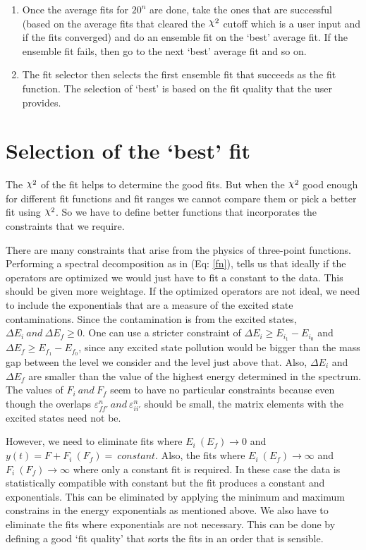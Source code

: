 \documentclass[10pt]{article}
\DeclareRobustCommand{\rchi}{{\mathpalette\irchi\relax}}
\newcommand{\irchi}[2]{\raisebox{\depth}{$#1\chi$}} %
\begin{document}
\begin{enumerate}
  \item Once the average fits for $20^n$ are done, take the ones that are successful (based on the average fits that cleared the $\rchi^2$ cutoff which is a user input and if the fits converged) and do an ensemble fit on the `best' average fit. If the ensemble fit fails, then go to the next `best' average fit and so on.
  \item The fit selector then selects the first ensemble fit that succeeds as the fit function. The selection of `best' is based on the fit quality that the user provides.
\end{enumerate}

\section{Selection of the `best' fit}
The $\rchi^2$ of the fit helps to determine the good fits. But when the $\rchi^2$ good enough for different fit functions and fit ranges we cannot compare them or pick a better fit using $\rchi^2$.  So we have to define better functions that incorporates the constraints that we require.  \par
There are many constraints that arise from the physics of three-point functions. Performing a spectral decomposition as in (Eq: \ref{fn}), tells us that ideally if the operators are optimized we would just have to fit a constant to the data. This should be given more weightage. If the optimized operators are not ideal, we need to include the exponentials that are a measure of the excited state contaminations. Since the contamination is from the excited states, $\Delta E_i\ and\ \Delta  E_f \ge 0$. One can use a stricter constraint of $\Delta E_i \ge E_{i_1} - E_{i_0}$ and $\Delta E_f \ge E_{f_1} - E_{f_0}$, since any excited state pollution would be bigger than the mass gap between the level we consider and the level just above that. Also, $\Delta E_i$ and $\Delta E_f$ are smaller than the value of the highest energy determined in the spectrum. The values of $F_i\ and\ F_f$ seem to have no particular constraints because even though the overlaps $\varepsilon^{n}_{ff'}\ and\ \varepsilon^{n}_{ii'}$ should be small, the matrix elements with the excited states need not be. \par
However, we need to eliminate fits where $E_i\ (E_f) \rightarrow 0$ and $y(t)= F + F_i\ (F_f) =\ constant$. Also, the fits where $E_i\ (E_f) \rightarrow \infty$ and $F_i\ (F_f) \rightarrow \infty$ where only a constant fit is required.  In these case the data is statistically compatible with constant but the fit produces a constant and exponentials. This can be eliminated by applying the minimum and maximum constrains in the energy exponentials as mentioned above. We also have to eliminate the fits where exponentials are not necessary. This can be done by defining a good `fit quality' that sorts the fits in an order that is sensible. \par
\end{document}
